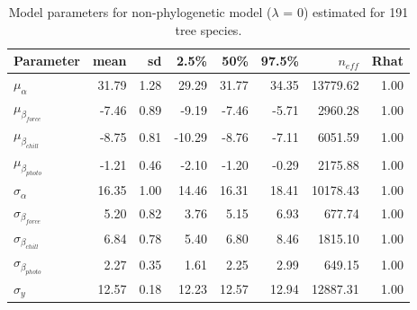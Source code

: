 \documentclass[11pt]{article}
\begin{document}
\begin{table}[ht]
\centering
\caption{Model parameters for non-phylogenetic model ($\lambda$ = 0) estimated for 191 tree species.} 
\label{tab:modlamb0}
\begingroup\footnotesize
\begin{tabular}{lrrrrrrr}
  \hline
Parameter & mean & sd & 2.5\% & 50\% & 97.5\% & $n_{eff}$ & Rhat \\ 
  \hline
$\mu_{\alpha}$ & 31.79 & 1.28 & 29.29 & 31.77 & 34.35 & 13779.62 & 1.00 \\ 
  $\mu_{\beta_{force}}$ & -7.46 & 0.89 & -9.19 & -7.46 & -5.71 & 2960.28 & 1.00 \\ 
  $\mu_{\beta_{chill}}$ & -8.75 & 0.81 & -10.29 & -8.76 & -7.11 & 6051.59 & 1.00 \\ 
  $\mu_{\beta_{photo}}$ & -1.21 & 0.46 & -2.10 & -1.20 & -0.29 & 2175.88 & 1.00 \\ 
  $\sigma_{\alpha}$ & 16.35 & 1.00 & 14.46 & 16.31 & 18.41 & 10178.43 & 1.00 \\ 
  $\sigma_{\beta_{force}}$ & 5.20 & 0.82 & 3.76 & 5.15 & 6.93 & 677.74 & 1.00 \\ 
  $\sigma_{\beta_{chill}}$ & 6.84 & 0.78 & 5.40 & 6.80 & 8.46 & 1815.10 & 1.00 \\ 
  $\sigma_{\beta_{photo}}$ & 2.27 & 0.35 & 1.61 & 2.25 & 2.99 & 649.15 & 1.00 \\ 
  $\sigma_y$ & 12.57 & 0.18 & 12.23 & 12.57 & 12.94 & 12887.31 & 1.00 \\ 
   \hline
\end{tabular}
\endgroup
\end{table} \clearpage \pagebreak 
\end{document}
